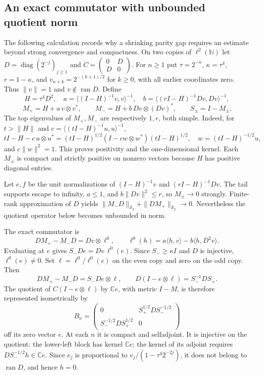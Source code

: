 \subsection{An exact commutator with unbounded quotient norm}
The following calculation records why a shrinking parity gap requires
an estimate beyond strong convergence and compactness.
On two copies of $\ell^2(\mathbb N)$ let
$D=\operatorname{diag}(2^{-j})_{j\ge1}$ and
$C=\left(\begin{smallmatrix}0&D\\D&0\end{smallmatrix}\right)$.
For $n\ge1$ put $\tau=2^{-n}$, $\kappa=\tau^4$, $r=1-\kappa$, and
$v_{n+k}=2^{-(k+1)/2}$ for $k\ge0$, with all earlier coordinates zero.
Thus $\|v\|=1$ and $v\notin\operatorname{ran}D$. Define
\[
 H=\tau^4D^2,\quad
 a=\langle(I-H)^{-1}v,v\rangle^{-1},\quad
 b=\langle(rI-H)^{-1}Dv,Dv\rangle^{-1},
\]
\[
 M_+=H+a\,v\otimes v^*,\qquad
 M_-=H+b\,Dv\otimes(Dv)^*,\qquad S_\pm=I-M_\pm.
\]
The top eigenvalues of $M_+,M_-$ are respectively $1,r$, both simple.
Indeed, for $t>\|H\|$ and $c=\langle(tI-H)^{-1}u,u\rangle^{-1}$,
\[
 tI-H-c\,u\otimes u^*
 =(tI-H)^{1/2}(I-cw\otimes w^*)(tI-H)^{1/2},\quad
 w=(tI-H)^{-1/2}u,
\]
and $c\|w\|^2=1$. This proves positivity and the one-dimensional
kernel. Each $M_\pm$ is compact and strictly positive on nonzero
vectors because $H$ has positive diagonal entries.

Let $e,f$ be the unit normalizations of $(I-H)^{-1}v$ and
$(rI-H)^{-1}Dv$. The tail supports escape to infinity,
$a\le1$, and $b\|Dv\|^2\le r$, so $M_\pm\to0$ strongly.
Finite-rank approximation of $D$ yields
$\|M_-D\|_{\mathcal S_2}+\|DM_+\|_{\mathcal S_2}\to0$.
Nevertheless the quotient operator below becomes unbounded in norm.

The exact commutator is
\[
 DM_+-M_-D=Dv\otimes\ell^0,\qquad
 \ell^0(h)=a\langle h,v\rangle-b\langle h,D^2v\rangle.
\]
Evaluating at $e$ gives $S_-De=Dv\,\ell^0(e)$.
Since $S_-\ge\kappa I$ and $D$ is injective, $\ell^0(e)\ne0$.
Set $\ell=\ell^0/\ell^0(e)$ on the even copy and zero on the odd
copy. Then
\[
 DM_+-M_-D=S_-De\otimes\ell,\qquad
 D(I-e\otimes\ell)=S_-^{-1}DS_+.
\]
The quotient of $C(I-e\otimes\ell)$ by $\mathbb Ce$, with metric
$I-M$, is therefore represented isometrically by
\[
 B_n=\begin{pmatrix}0&S_+^{1/2}DS_-^{-1/2}\\
 S_-^{-1/2}DS_+^{1/2}&0\end{pmatrix}
\]
off its zero vector $e$. At each $n$ it is compact and selfadjoint.
It is injective on the quotient: the lower-left block has kernel
$\mathbb Ce$; the kernel of its adjoint requires
$DS_-^{-1/2}h\in\mathbb Ce$. Since
$e_j$ is proportional to $v_j/(1-\tau^4 2^{-2j})$, it does not belong
to $\operatorname{ran}D$, and hence $h=0$.

